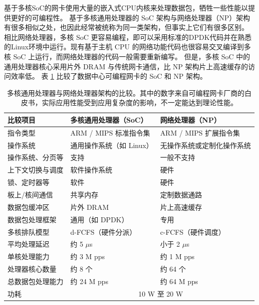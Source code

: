 基于多核SoC的网卡使用大量的嵌入式CPU内核来处理数据包，牺牲一些性能以提供更好的可编程性。
基于多核通用处理器的 SoC 架构与网络处理器（NP）架构有很多相似之处，也因此经常被统称为同一类架构，但事实上它们有很多区别。
相比网络处理器，多核 SoC 更容易编程，即可以采用标准的DPDK代码并在熟悉的Linux环境中运行。现有基于主机 CPU 的网络功能代码也很容易交叉编译到多核 SoC 上运行，而网络处理器的代码一般需要重新编写。
但是，多核 SoC 中的通用处理器核心采用片外 DRAM 与传统网卡通信，比 NP 架构片上高速缓存的访问效率低。
表 \ref{background:tab:soc-vs-np} 比较了数据中心可编程网卡的 SoC 和 NP 架构。

\begin{table}[htbp]
	\centering
	\caption{多核通用处理器与网络处理器架构的比较。其中的数字来自可编程网卡厂商的白皮书，实际应用性能受到应用复杂度的影响，不一定能达到理论性能。}
	\small
	\begin{tabular}{l|p{}|p{}}
		\hline
		比较项目 & 多核通用处理器（SoC） & 网络处理器（NP） \\
		\hline
		\hline
		指令类型 & ARM / MIPS 标准指令集 & ARM / MIPS 扩展指令集 \\
		\hline
		操作系统 & 通用操作系统（如 Linux） & 无操作系统或定制化操作系统 \\
		\hline
		操作系统、分页等 & 支持 & 一般不支持 \\
		\hline
		上下文切换与调度 & 软件操作系统 & 硬件 \\
		\hline
		锁、定时器等 & 软件 & 硬件 \\
		\hline
		板上/核间通信 & 共享内存 & 定制数据通路 \\
		\hline
		数据包缓冲区 & 片外 DRAM & 片上高速缓存 \\
		\hline
		数据包处理框架 & 通用（如 DPDK） & 专用 \\
		\hline
		多核排队模型 & d-FCFS（硬件分派） & c-FCFS（硬件调度） \\
		\hline
		平均处理延迟 & 约 5 $\mu$s & 小于 2 $\mu$s \\
		\hline
		单核处理能力 & 约 3 M pps & 约 1 M pps \\
		\hline
		处理器核心数量 & 约 8 个 & 约 64 个 \\
		\hline
		总数据包处理能力 & 约 24 M pps & 约 64 M pps \\
		\hline
		功耗 & \multicolumn{2}{c}{10 W 至 20 W} \\ 
		\hline
	\end{tabular}
	\label{background:tab:soc-vs-np}
\end{table}


